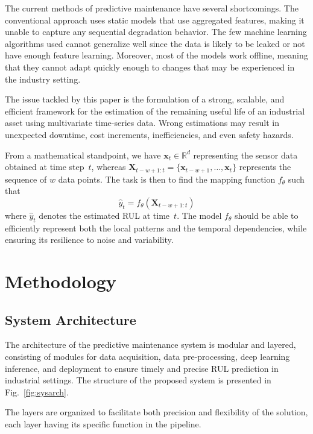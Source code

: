 \documentclass[conference]{IEEEtran}
\begin{document}
The current methods of predictive maintenance have several shortcomings. The conventional approach uses static models that use aggregated features, making it unable to capture any sequential degradation behavior. The few machine learning algorithms used cannot generalize well since the data is likely to be leaked or not have enough feature learning. Moreover, most of the models work offline, meaning that they cannot adapt quickly enough to changes that may be experienced in the industry setting.

The issue tackled by this paper is the formulation of a strong, scalable, and efficient framework for the estimation of the remaining useful life of an industrial asset using multivariate time-series data. Wrong estimations may result in unexpected downtime, cost increments, inefficiencies, and even safety hazards.

From a mathematical standpoint, we have $\mathbf{x}_{t} \in \mathbb{R}^{d}$ representing the sensor data obtained at time step~$t$, whereas $\mathbf{X}_{t-w+1:t} = \{\mathbf{x}_{t-w+1}, \ldots, \mathbf{x}_{t}\}$ represents the sequence of $w$ data points. The task is then to find the mapping function $f_{\theta}$ such that
\begin{equation}
  \hat{y}_{t} = f_{\theta}(\mathbf{X}_{t-w+1:t})
  \label{eq:problem}
\end{equation}
where $\hat{y}_{t}$ denotes the estimated RUL at time~$t$. The model $f_{\theta}$ should be able to efficiently represent both the local patterns and the temporal dependencies, while ensuring its resilience to noise and variability.

\section{Methodology}

\subsection{System Architecture}

The architecture of the predictive maintenance system is modular and layered, consisting of modules for data acquisition, data pre-processing, deep learning inference, and deployment to ensure timely and precise RUL prediction in industrial settings. The structure of the proposed system is presented in Fig.~\ref{fig:sysarch}.

The layers are organized to facilitate both precision and flexibility of the solution, each layer having its specific function in the pipeline.
\end{document}
